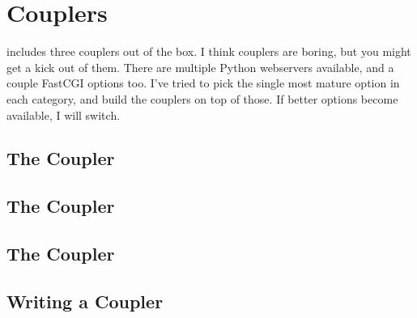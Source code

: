 \section{Couplers \label{couplers}}

 includes three couplers out of the box. I think couplers are
boring, but you might get a kick out of them. There are multiple Python
webservers available, and a couple FastCGI options too. I've tried to pick the
single most mature option in each category, and build the couplers on top of
those. If better options become available, I will switch.


\subsection{The  Coupler \label{cgi}}
\subsection{The  Coupler \label{fastcgi}}
\subsection{The  Coupler \label{standalone}}
\subsection{Writing a Coupler \label{writing-a-coupler}}
